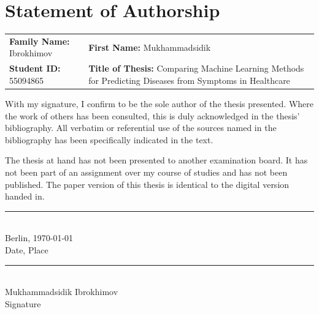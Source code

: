 \chapter*{Statement of Authorship}

\renewcommand{\arraystretch}{1.4}
\noindent
\begin{tabular}{@{}p{7.3cm} p{7.3cm}@{}}
\textbf{Family Name:} Ibrokhimov & \textbf{First Name:} Mukhammadsidik \\[0.3cm]
\textbf{Student ID:} 55094865 & \textbf{Title of Thesis:} Comparing Machine Learning Methods for Predicting Diseases from Symptoms in Healthcare \\
\end{tabular}

\vspace{0.8cm}

\noindent With my signature, I confirm to be the sole author of the thesis presented. Where the work of others has been consulted, this is duly acknowledged in the thesis' bibliography. All verbatim or referential use of the sources named in the bibliography has been specifically indicated in the text.

\vspace{0.4cm}

\noindent The thesis at hand has not been presented to another examination board. It has not been part of an assignment over my course of studies and has not been published. The paper version of this thesis is identical to the digital version handed in.

\vfill

\noindent
\begin{minipage}[t]{0.45\textwidth}
\rule{\textwidth}{0.4pt}\\
Berlin, \today\\[0.1cm]
{\small Date, Place}
\end{minipage}
\hfill
\begin{minipage}[t]{0.45\textwidth}
\rule{\textwidth}{0.4pt}\\
Mukhammadsidik Ibrokhimov\\[0.1cm]
{\small Signature}
\end{minipage}

\clearpage
